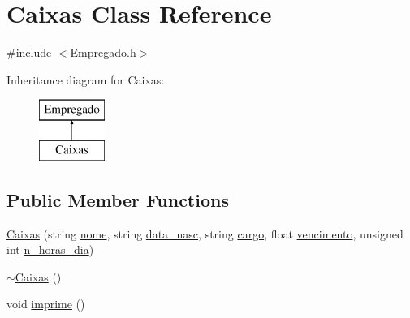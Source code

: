 \hypertarget{class_caixas}{
\section{Caixas Class Reference}
\label{class_caixas}
}


{\ttfamily \#include $<$Empregado.h$>$}

Inheritance diagram for Caixas:\begin{figure}[H]
\begin{center}
\leavevmode
\includegraphics[height=2.000000cm]{class_caixas}
\end{center}
\end{figure}
\subsection*{Public Member Functions}
\begin{DoxyCompactItemize}
\item 
\hyperlink{class_caixas_af68206dd17ac557568e2f5c4cee460c4}{Caixas} (string \hyperlink{class_empregado_a3ef62ed62672a17b1c7769eb0e954a34}{nome}, string \hyperlink{class_empregado_add428a10de63973303f960cd984e3c41}{data\_\-nasc}, string \hyperlink{class_empregado_a6a3290cc27e7d4c00d430fedd90254c9}{cargo}, float \hyperlink{class_empregado_a7580affd67f7e1c240c8c98cfd11e195}{vencimento}, unsigned int \hyperlink{class_empregado_ab8c2aa44f61f58fb592fc3d8a7466c34}{n\_\-horas\_\-dia})
\item 
\hyperlink{class_caixas_a2567846c26a127c71065793b35f285a9}{$\sim$Caixas} ()
\item 
void \hyperlink{class_caixas_a891be0ba445c037169ff0f3ae7da7f7a}{imprime} ()
\end{DoxyCompactItemize}


